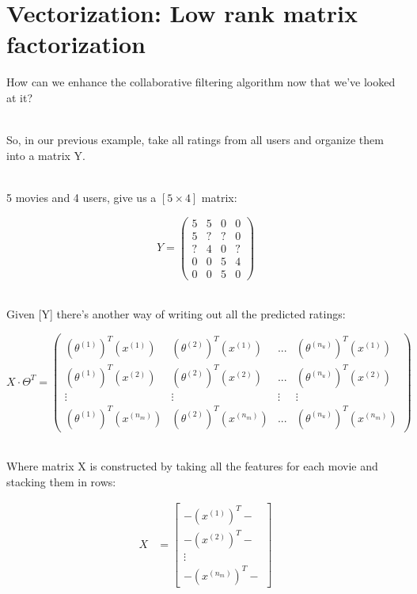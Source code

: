 \documentclass{article}
\begin{document}
\section*{Vectorization: Low rank matrix factorization}

How can we enhance the collaborative filtering algorithm now that we've looked at it?

~\\
So, in our previous example, take all ratings from all users and organize them into a matrix Y.

~\\
5 movies and 4 users, give us a $[5 \times 4]$ matrix:

\begin{equation*}
  Y =
  \begin{pmatrix}
    5 & 5 & 0 & 0 \\
    5 & ? & ? & 0 \\
    ? & 4 & 0 & ? \\
    0 & 0 & 5 & 4 \\
    0 & 0 & 5 & 0
  \end{pmatrix}
\end{equation*}

~\\
Given [Y] there's another way of writing out all the predicted ratings:

\begin{equation*}
  X \cdot \Theta^T =
  \begin{pmatrix}
    (\theta^{(1)})^T(x^{(1)})   & (\theta^{(2)})^T(x^{(1)})   & ...    & (\theta^{(n_u)})^T(x^{(1)})   \\
    (\theta^{(1)})^T(x^{(2)})   & (\theta^{(2)})^T(x^{(2)})   & ...    & (\theta^{(n_u)})^T(x^{(2)})   \\
    \vdots                      & \vdots                      & \vdots & \vdots                        \\
    (\theta^{(1)})^T(x^{(n_m)}) & (\theta^{(2)})^T(x^{(n_m)}) & ...    & (\theta^{(n_u)})^T(x^{(n_m)})
  \end{pmatrix}
\end{equation*}

~\\
Where matrix X is constructed by taking all the features for each movie and stacking them in rows:

\begin{align*}
  X & = \begin{bmatrix}
    -(x^{(1)})^T-   \\
    -(x^{(2)})^T-   \\
    \vdots          \\
    -(x^{(n_m)})^T-
  \end{bmatrix}
\end{align*}
\end{document}
